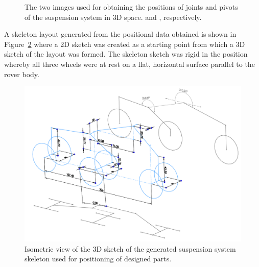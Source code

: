       \begin{figure}[h!]
      \centering
      \qquad
      \caption[The two images used for obtaining the positions of joints and pivots of the suspension system in 3D space.]{The two images used for obtaining the positions of joints and pivots of the suspension system in 3D space. \cite{fig:mechDesign-suspensionReferences1_cite} and \cite{fig:mechDesign-suspensionReferences2_cite}, respectively.}
      \label{fig:mechDesign-suspensionReferences}
      \end{figure}

      A skeleton layout generated from the positional data obtained is shown in Figure~\ref{fig:mechDesign-suspension3d} where a 2D sketch was created as a starting point from which a 3D sketch of the layout was formed. The skeleton sketch was rigid in the position whereby all three wheels were at rest on a flat, horizontal surface parallel to the rover body.
            
      \begin{figure}[h!]
        \centering
        \includegraphics[width=0.9\linewidth]{figures/suspension3D}
        \caption[Isometric view of the 3D sketch of the generated suspension system skeleton used for positioning of designed parts.]{Isometric view of the 3D sketch of the generated suspension system skeleton used for positioning of designed parts.}
        \label{fig:mechDesign-suspension3d}
      \end{figure}
      
